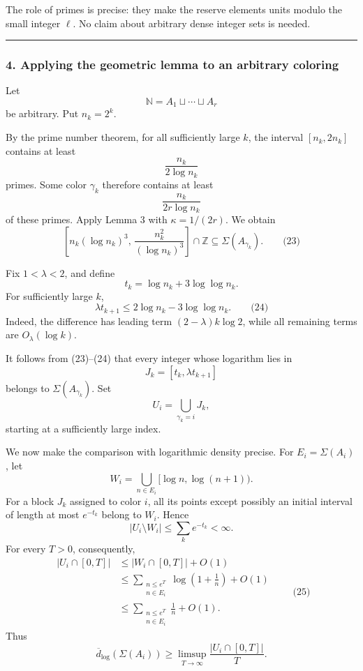 \documentclass[
  11pt,
  a4paper,
]{article}
\begin{document}
The role of primes is precise: they make the reserve elements units
modulo the small integer \(\ell\). No claim about arbitrary dense
integer sets is needed.

\begin{center}\rule{0.5\linewidth}{0.5pt}\end{center}

\subsubsection{4. Applying the geometric lemma to an arbitrary
coloring}\label{applying-the-geometric-lemma-to-an-arbitrary-coloring}

Let \[
\mathbb N=A_1\sqcup\cdots\sqcup A_r
\] be arbitrary. Put \(n_k=2^k\).

By the prime number theorem, for all sufficiently large \(k\), the
interval \([n_k,2n_k]\) contains at least \[
\frac{n_k}{2\log n_k}
\] primes. Some color \(\gamma_k\) therefore contains at least \[
\frac{n_k}{2r\log n_k}
\] of these primes. Apply Lemma 3 with \(\kappa=1/(2r)\). We obtain \[
\left[n_k(\log n_k)^3,\,
\frac{n_k^2}{(\log n_k)^3}\right]\cap\mathbb Z
\subseteq\Sigma(A_{\gamma_k}).
\qquad\text{(23)}
\]

Fix \(1<\lambda<2\), and define \[
t_k=\log n_k+3\log\log n_k.
\] For sufficiently large \(k\), \[
\lambda t_{k+1}
\le 2\log n_k-3\log\log n_k.
\qquad\text{(24)}
\] Indeed, the difference has leading term \((2-\lambda)k\log2\), while
all remaining terms are \(O_\lambda(\log k)\).

It follows from (23)--(24) that every integer whose logarithm lies in \[
J_k=[t_k,\lambda t_{k+1}]
\] belongs to \(\Sigma(A_{\gamma_k})\). Set \[
U_i=\bigcup_{\gamma_k=i}J_k,
\] starting at a sufficiently large index.

We now make the comparison with logarithmic density precise. For
\(E_i=\Sigma(A_i)\), let \[
W_i=\bigcup_{n\in E_i}[\log n,\log(n+1)).
\] For a block \(J_k\) assigned to color \(i\), all its points except
possibly an initial interval of length at most \(e^{-t_k}\) belong to
\(W_i\). Hence \[
|U_i\setminus W_i|
\le\sum_k e^{-t_k}<\infty.
\] For every \(T>0\), consequently, \begin{equation*}
\begin{aligned}
|U_i\cap[0,T]|
&\le |W_i\cap[0,T]|+O(1)\\
&\le\sum_{\substack{n\le e^T\\n\in E_i}}
       \log\left(1+\frac1n\right)+O(1)\\
&\le\sum_{\substack{n\le e^T\\n\in E_i}}\frac1n+O(1).
\end{aligned}
\qquad\text{(25)}
\end{equation*} Thus \[
\overline d_{\log}(\Sigma(A_i))
\ge
\limsup_{T\to\infty}\frac{|U_i\cap[0,T]|}{T}.
\]
\end{document}
